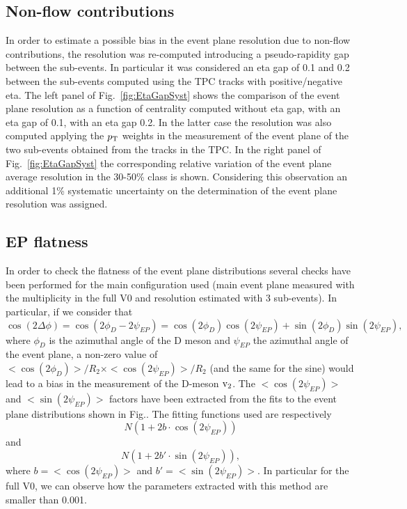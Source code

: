 \subsection{Non-flow contributions}
\label{sec:NonFlow}
In order to estimate a possible bias 
in the event plane resolution due to non-flow contributions, 
the resolution was re-computed introducing 
a pseudo-rapidity gap between the sub-events. 
In particular it was considered an eta 
gap of 0.1 and 0.2 between the sub-events computed using
 the TPC tracks with positive/negative 
eta. The left panel of Fig.~\ref{fig:EtaGapSyst} shows
 the comparison of the event plane resolution
as a function of centrality computed without eta gap, 
with an eta gap of 0.1, with an eta gap 0.2. 
In the latter case the resolution was also computed 
applying the $p_{\rm T}$ weights in the measurement of
the event plane of the two sub-events obtained from the tracks in the TPC.
In the right panel of Fig.~\ref{fig:EtaGapSyst} the corresponding 
relative variation of the event plane average resolution in the
30-50\% class is shown. Considering this observation an additional 1\%
 systematic uncertainty on the determination of the
event plane resolution was assigned.
\iffalse
\subsection{EP flatness}
\label{sec:EPflat}
In order to check the flatness of the event plane 
distributions several checks have been performed 
for the main configuration used (main event plane 
measured with the multiplicity in the full V0 and
 resolution estimated with 3 sub-events). In particular, if we consider that
\begin{equation}
\cos(2\Delta\phi) = \cos(2\phi_D-2\psi_{EP}) = \cos(2\phi_D)\cos(2\psi_{EP})+\sin(2\phi_D)\sin(2\psi_{EP}),
\end{equation}
where $\phi_D$ is the azimuthal angle of the D meson 
and $\psi_{EP}$ the azimuthal angle of the event plane, 
a non-zero value of 
$< \cos(2\phi_D) >/R_2 \times < \cos(2\psi_{EP}) >/R_2$ 
(and the same for the sine) would lead to a bias in the 
measurement of the D-meson $\rm v_2$. The  
$< \cos(2\psi_{EP}) >$ and $< \sin(2\psi_{EP}) >$ factors 
have been extracted from the fits to the event plane 
distributions shown in Fig.. The fitting functions used are respectively 
\begin{equation}
N(1+2b\cdot \cos(2\psi_{EP}))
\end{equation}
and 
\begin{equation}
N(1+2b'\cdot \sin(2\psi_{EP})),
\end{equation}
where $b = < \cos(2\psi_{EP}) >$ and $b' = < \sin(2\psi_{EP}) >$.
In particular for the full V0, we can observe how the parameters 
extracted with this method are smaller than 0.001.


